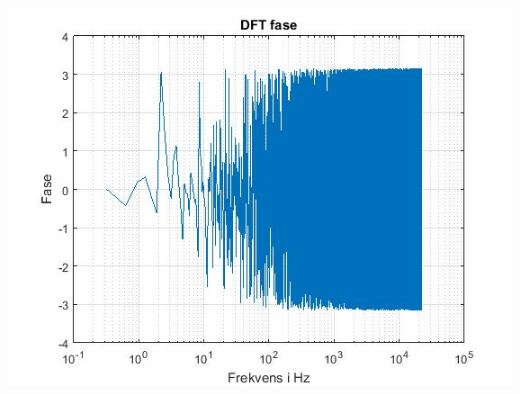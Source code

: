 \documentclass[12pt, letterpaper]{article}
\begin{document}
\begin{figure}[!h]
           \begin{floatrow}
           \end{floatrow}
\end{figure}

\begin{center}
\includegraphics[width=0.55\linewidth]{billeder/fasebilmotor}
\end{center}
\end{document}
